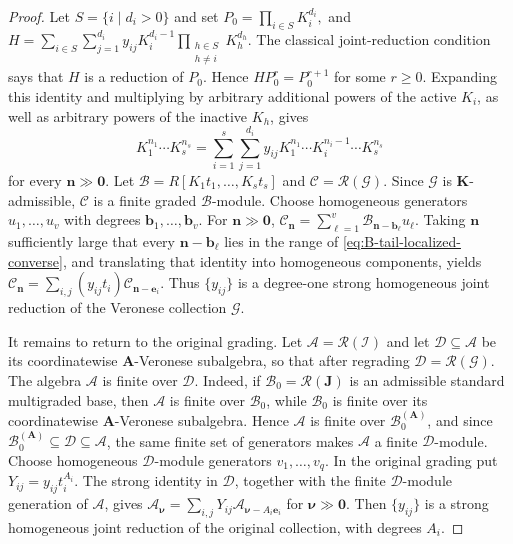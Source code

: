 \documentclass[reqno,12pt]{amsart}
\theoremstyle{plain}
\theoremstyle{definition}
\theoremstyle{remark}
\numberwithin{equation}{section}
\begin{document}
\begin{proof}
Let $S=\{i\mid d_i>0\}$ and set $P_0=\prod_{i\in S}K_i^{d_i},$ and  $H=
\sum_{i\in S}\sum_{j=1}^{d_i}
y_{ij}K_i^{d_i-1}
\prod_{\substack{h\in S\\h\neq i}}K_h^{d_h}.$
The classical joint-reduction condition says that $H$ is a reduction
of $P_0$. Hence $HP_0^r=P_0^{r+1}$ for some $r\geq0$. Expanding this
identity and multiplying by arbitrary additional powers of the active
$K_i$, as well as arbitrary powers of the inactive $K_h$, gives
\begin{equation}
\label{eq:B-tail-localized-converse}
K_1^{n_1}\cdots K_s^{n_s}
=
\sum_{i=1}^{s}\sum_{j=1}^{d_i}
y_{ij}
K_1^{n_1}\cdots K_i^{n_i-1}\cdots K_s^{n_s}
\end{equation}
for every $\mathbf n\gg\mathbf0$. Let $\mathcal B=R[K_1t_1,\ldots,K_st_s]$ and
$\mathcal C=\mathcal R(\boldsymbol{\mathcal G})$.
Since $\boldsymbol{\mathcal G}$ is $\mathbf K$-admissible,
$\mathcal C$ is a finite graded $\mathcal B$-module. Choose homogeneous
generators $u_1,\ldots,u_v$ with degrees
$\mathbf b_1,\ldots,\mathbf b_v$. For $\mathbf n\gg\mathbf0$, $\mathcal C_{\mathbf n}
=
\sum_{\ell=1}^{v}
\mathcal B_{\mathbf n-\mathbf b_\ell}u_\ell.$
Taking $\mathbf n$ sufficiently large that every
$\mathbf n-\mathbf b_\ell$ lies in the range of
\eqref{eq:B-tail-localized-converse}, and translating that identity into
homogeneous components, yields $\mathcal C_{\mathbf n}
=
\sum_{i,j}(y_{ij}t_i)\mathcal C_{\mathbf n-\mathbf e_i}.$
Thus $\{y_{ij}\}$ is a degree-one strong homogeneous joint reduction of
the Veronese collection $\boldsymbol{\mathcal G}$.

It remains to return to the original grading. Let
$\mathcal A=\mathcal R(\boldsymbol{\mathcal I})$ and let
$\mathcal D\subseteq\mathcal A$ be its coordinatewise
$\mathbf A$-Veronese subalgebra, so that after regrading
$\mathcal D=\mathcal R(\boldsymbol{\mathcal G})$. The algebra
$\mathcal A$ is finite over $\mathcal D$. Indeed, if
$\mathcal B_0=\mathcal R(\mathbf J)$ is an admissible standard
multigraded base, then $\mathcal A$ is finite over $\mathcal B_0$, while
$\mathcal B_0$ is finite over its coordinatewise
$\mathbf A$-Veronese subalgebra. Hence $\mathcal A$ is finite over
$\mathcal B_0^{(\mathbf A)}$, and since
$\mathcal B_0^{(\mathbf A)}\subseteq\mathcal D\subseteq\mathcal A$,
the same finite set of generators makes $\mathcal A$ a finite
$\mathcal D$-module. Choose homogeneous $\mathcal D$-module generators
$v_1,\ldots,v_q$. In the original grading put
$Y_{ij}=y_{ij}t_i^{A_i}$. The strong identity in $\mathcal D$, together
with the finite $\mathcal D$-module generation of $\mathcal A$, gives $\mathcal A_{\boldsymbol\nu}
=
\sum_{i,j}
Y_{ij}\mathcal A_{\boldsymbol\nu-A_i\mathbf e_i}$  for $\boldsymbol\nu\gg\mathbf0$.
Then $\{y_{ij}\}$ is a strong homogeneous joint reduction of the
original collection, with degrees $A_i$.


\end{proof}
\end{document}
